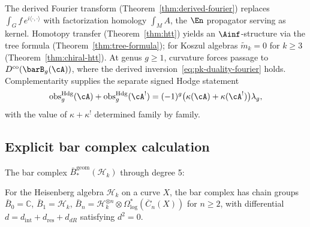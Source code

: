 \begin{remark}
\label{rem:fh-fourier}\label{rem:htt-fourier}\label{rem:curved-fourier}
The derived Fourier transform (Theorem~\ref{thm:derived-fourier}) replaces $\int_G f\, e^{i\langle\cdot,\cdot\rangle}$ with factorization homology $\int_M A$, the $\En$ propagator serving as kernel. Homotopy transfer (Theorem~\ref{thm:htt}) yields an $\Ainf$-structure via the tree formula (Theorem~\ref{thm:tree-formula}); for Koszul algebras $\tilde{m}_k = 0$ for $k \geq 3$ (Theorem~\ref{thm:chiral-htt}). At genus $g \geq 1$, curvature forces passage to $D^{\mathrm{co}}(\barB_g(\cA))$, where the derived inversion~\eqref{eq:pk-duality-fourier} holds. Complementarity supplies the separate signed Hodge statement
\[
\operatorname{obs}^{\mathrm{Hdg}}_g(\cA)
+\operatorname{obs}^{\mathrm{Hdg}}_g(\cA^!)
=(-1)^g\bigl(\kappa(\cA)+\kappa(\cA^!)\bigr)\lambda_g,
\]
with the value of $\kappa+\kappa^!$ determined family by family.
\end{remark}

\subsection{Explicit bar complex calculation}

The bar complex $\bar{B}^{\text{geom}}_*(\mathcal{H}_k)$ through degree 5:

\begin{theorem}\label{thm:heisenberg-bar-complete}
For the Heisenberg algebra $\mathcal{H}_k$ on a curve $X$, the bar complex has chain groups
$\bar{B}_0 = \mathbb{C}$,
$\bar{B}_1 = \mathcal{H}_k$,
$\bar{B}_n = \mathcal{H}_k^{\otimes n} \otimes \Omega^*_{\log}(\overline{C}_n(X))$
for $n \geq 2$, with differential
$d = d_{\text{int}} + d_{\text{res}} + d_{dR}$
satisfying $d^2 = 0$.
\end{theorem}

